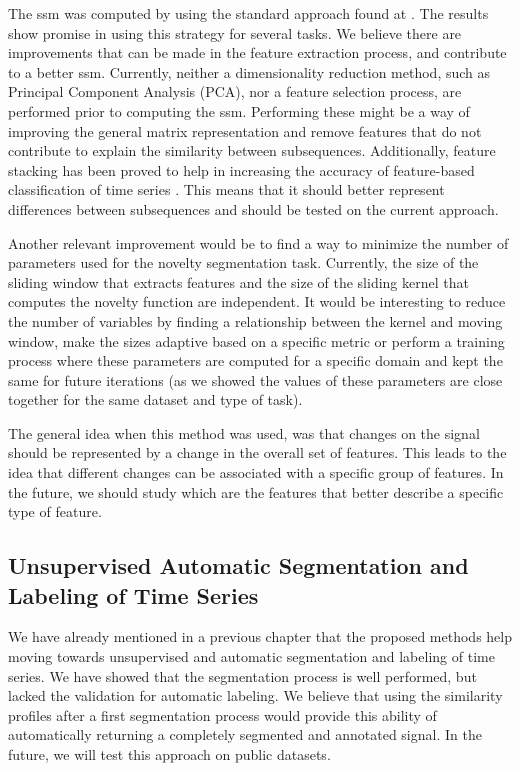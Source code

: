 The \gls{ssm} was computed by using the standard approach found at \cite{fmp1}. The results show promise in using this strategy for several tasks. We believe there are improvements that can be made in the feature extraction process, and contribute to a better \gls{ssm}. Currently, neither a dimensionality reduction method, such as Principal Component Analysis (PCA), nor a feature selection process, are performed prior to computing the \gls{ssm}. Performing these might be a way of improving the general matrix representation and remove features that do not contribute to explain the similarity between subsequences. Additionally, feature stacking has been proved to help in increasing the accuracy of feature-based classification of time series \cite{hartmann2021featurespace}. This means that it should better represent differences between subsequences and should be tested on the current approach.
\par
Another relevant improvement would be to find a way to minimize the number of parameters used for the novelty segmentation task. Currently, the size of the sliding window that extracts features and the size of the sliding kernel that computes the novelty function are independent. It would be interesting to reduce the number of variables by finding a relationship between the kernel and moving window, make the sizes adaptive based on a specific metric or perform a training process where these parameters are computed for a specific domain and kept the same for future iterations (as we showed the values of these parameters are close together for the same dataset and type of task).
\par
The general idea when this method was used, was that changes on the signal should be represented by a change in the overall set of features. This leads to the idea that different changes can be associated with a specific group of features. In the future, we should study which are the features that better describe a specific type of feature.

\subsection{Unsupervised Automatic Segmentation and Labeling of Time Series}

We have already mentioned in a previous chapter that the proposed methods help moving towards unsupervised and automatic segmentation and labeling of time series. We have showed that the segmentation process is well performed, but lacked the validation for automatic labeling. We believe that using the similarity profiles after a first segmentation process would provide this ability of automatically returning a completely segmented and annotated signal. In the future, we will test this approach on public datasets.

